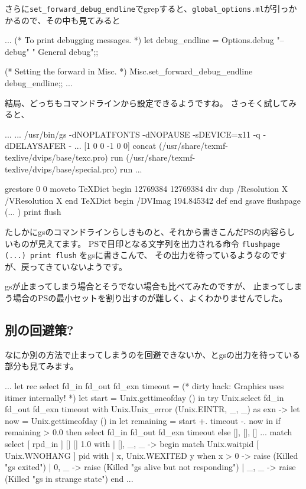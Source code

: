 \documentclass[mingoth,a4paper]{jsarticle}
\begin{document}
さらに\verb|set_forward_debug_endline|でgrepすると、\verb|global_options.ml|が引っかかるので、その中も見てみると

\begin{commandline}
...
(* To print debugging messages. *)
let debug_endline = Options.debug "--debug" " General debug";;

(* Setting the forward in Misc. *)
Misc.set_forward_debug_endline debug_endline;;
...
\end{commandline}

結局、どっちもコマンドラインから設定できるようですね。
さっそく試してみると、

\begin{commandline}
...
...
/usr/bin/gs
-dNOPLATFONTS
-dNOPAUSE
-sDEVICE=x11
-q
-dDELAYSAFER
-
...
[1 0 0 -1 0 0] concat
(/usr/share/texmf-texlive/dvips/base/texc.pro) run
(/usr/share/texmf-texlive/dvips/base/special.pro) run
...

grestore
0 0 moveto
TeXDict begin 12769384 12769384 div dup /Resolution X /VResolution X end
TeXDict begin /DVImag 194.845342 def end
gsave
flushpage (...
) print flush 
\end{commandline}

たしかにgsのコマンドラインらしきものと、それから書きこんだPSの内容らしいものが見えてます。
PSで目印となる文字列を出力される命令 \verb|flushpage (...) print flush| をgsに書きこんで、
その出力を待っているようなのですが、戻ってきていないようです。

gsが止まってしまう場合とそうでない場合も比べてみたのですが、
止まってしまう場合のPSの最小セットを割り出すのが難しく、よくわかりませんでした。

\subsection{別の回避策?}

なにか別の方法で止まってしまうのを回避できないか、とgsの出力を待っている部分も見てみます。

\begin{commandline}
...
let rec select fd_in fd_out fd_exn timeout =
  (* dirty hack: Graphics uses itimer internally! *)
  let start = Unix.gettimeofday () in
  try
    Unix.select fd_in fd_out fd_exn timeout
  with
    Unix.Unix_error (Unix.EINTR, _, _) as exn ->
      let now = Unix.gettimeofday () in
      let remaining = start +. timeout -. now in
      if remaining > 0.0 then select fd_in fd_out fd_exn timeout else [], [], []
...
      match select [ rpd_in ] [] [] 1.0 with
      | [], _, _ ->
          begin match Unix.waitpid [ Unix.WNOHANG ] pid with
          | x, Unix.WEXITED y when x > 0 ->
              raise (Killed "gs exited")
          | 0, _ ->
              raise (Killed "gs alive but not responding")
          | _, _ ->
              raise (Killed "gs in strange state")
          end
...
\end{commandline}
\end{document}
